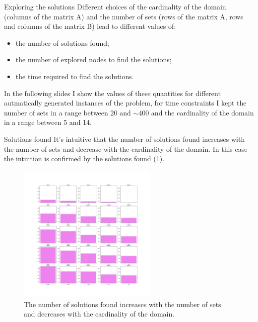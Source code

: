 \documentclass{beamer}
\begin{document}

\begin{frame}{Exploring the solutions}
    Different choices of the cardinality of the domain (columns of the matrix A) and
    the number of sets (rows of the matrix A, rows and columns of the matrix B) 
    lead to different values of:
    \begin{itemize}
        \item the number of solutions found;
        \item the number of explored nodes to find the solutions;
        \item the time required to find the solutions.
    \end{itemize}
    In the following slides I show the values of these quantities for different
    autmatically generated instances of the problem, for time constraints I kept the 
    number of sets in a range between 20 and $\sim400$ and the cardinality of the domain
    in a range between 5 and 14.
\end{frame}

\begin{frame}{Solutions found}
    It's intuitive that the number of solutions found increases
    with the number of sets and decrease with the cardinality of the domain.
    In this case the intuition is confirmed by the solutions found (\ref{fig:sol_5x5}).
\end{frame}

\begin{frame}
    \begin{figure}
        \centering
        \includegraphics[width=0.6\textwidth]{sol_5x5.pdf}
        \caption{The number of solutions found increases with the number of sets 
        and decreases with the cardinality of the domain.}
        \label{fig:sol_5x5}
    \end{figure}
\end{frame}
\end{document}
